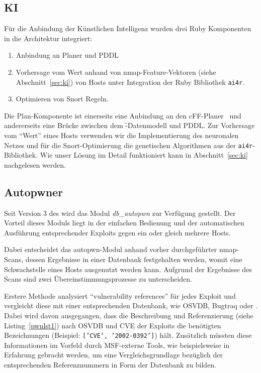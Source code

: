 \subsection{KI}

Für die Anbindung der Künstlichen Intelligenz wurden drei Ruby Komponenten
in die Architektur integriert:

\begin{enumerate}
  \item Anbindung an Planer und PDDL
  \item Vorhersage vom Wert anhand von nmap-Feature-Vektoren (siehe
    Abschnitt~\ref{sec:ki}) von Hosts unter Integration der Ruby Bibliothek
    \texttt{ai4r}.
  \item Optimieren von Snort Regeln.
\end{enumerate}

Die Plan-Komponente ist einerseits eine Anbindung an den cFF-Planer~\cite{CFF}
und andererseits eine Brücke zwischen dem
\f-Datenmodell und PDDL. Zur Vorhersage vom \enquote{Wert} eines Hosts
verwenden wir die Implementierung des neuronalen Netzes und für die
Snort-Optimierung die genetischen Algorithmen aus der \texttt{ai4r}-Bibliothek.
Wie unser Lösung im Detail funktioniert kann in Abschnitt~\ref{sec:ki}
nachgelesen werden.

\subsection{Autopwner}
\label{sec:autopwner}

Seit Version 3 des  wird das Modul \textit{db\_autopwn} zur
Verfügung gestellt. Der Vorteil dieses Moduls liegt in der einfachen
Bedienung und der automatischen Ausführung entsprechender Exploits
gegen ein oder gleich mehrere Hosts.

Dabei entscheidet das autopwn-Modul anhand vorher durchgeführter
nmap-Scans, dessen Ergebnisse in einer Datenbank festgehalten werden,
womit eine Schwachstelle eines Hosts ausgenutzt werden kann. Aufgrund
der Ergebnisse des Scans sind zwei Übereinstimmungsprozesse zu
unterscheiden.

Erstere Methode analysiert \enquote{vulnerability references} für jedes
Exploit und vergleicht diese mit einer entsprechenden Datenbank, wie
OSVDB, Bugtraq oder .
Dabei wird davon ausgegangen, dass die Beschreibung und Referenzierung
(siehe Listing~\ref{pwnlst1}) nach OSVDB und CVE der Exploits die benötigten
Bezeichnungen (Beispiel: \texttt{['CVE', '2002-0392']}) hält.
Zusätzlich müssten diese Informationen im Vorfeld durch MSF-externe
Tools, wie beispielsweise  in Erfahrung gebracht werden, um eine
Vergleichsgrundlage bezüglich der entsprechenden Referenznummern in Form
der Datenbank zu bilden.

